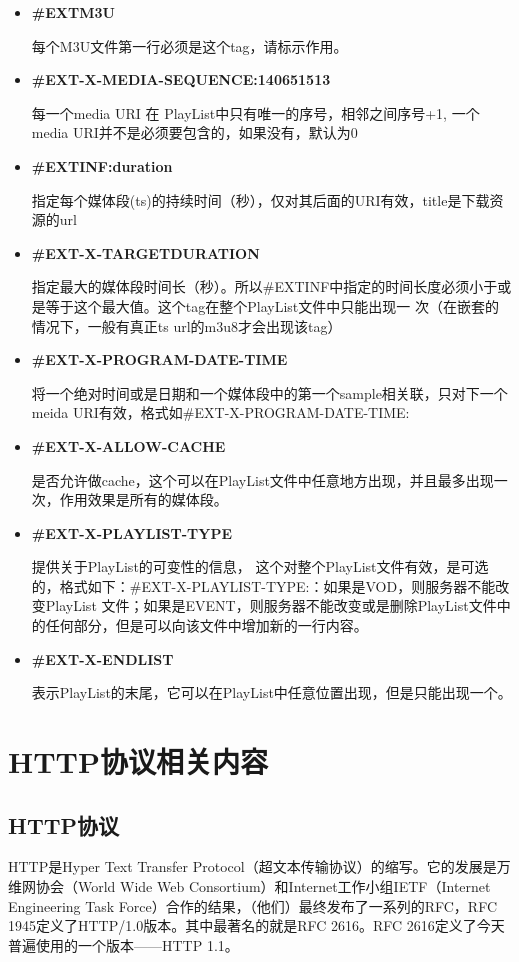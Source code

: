 \documentclass[bachelor]{thesis-uestc}
\begin{document}
\begin{itemize}
	\item \textbf{\#EXTM3U}

		每个M3U文件第一行必须是这个tag，请标示作用。
	\item \textbf{\#EXT-X-MEDIA-SEQUENCE:140651513} 

		每一个media URI 在 PlayList中只有唯一的序号，相邻之间序号+1, 一个media URI并不是必须要包含的，如果没有，默认为0
	\item \textbf{\#EXTINF:duration} 

		指定每个媒体段(ts)的持续时间（秒），仅对其后面的URI有效，title是下载资源的url
	\item \textbf{\#EXT-X-TARGETDURATION}

		指定最大的媒体段时间长（秒）。所以\#EXTINF中指定的时间长度必须小于或是等于这个最大值。这个tag在整个PlayList文件中只能出现一 次（在嵌套的情况下，一般有真正ts url的m3u8才会出现该tag）
	\item \textbf{\#EXT-X-PROGRAM-DATE-TIME}

		将一个绝对时间或是日期和一个媒体段中的第一个sample相关联，只对下一个meida URI有效，格式如\#EXT-X-PROGRAM-DATE-TIME:
	\item \textbf{\#EXT-X-ALLOW-CACHE}

		是否允许做cache，这个可以在PlayList文件中任意地方出现，并且最多出现一次，作用效果是所有的媒体段。
	\item \textbf{\#EXT-X-PLAYLIST-TYPE}

		提供关于PlayList的可变性的信息， 这个对整个PlayList文件有效，是可选的，格式如下：\#EXT-X-PLAYLIST-TYPE:：如果是VOD，则服务器不能改变PlayList 文件；如果是EVENT，则服务器不能改变或是删除PlayList文件中的任何部分，但是可以向该文件中增加新的一行内容。
	\item \textbf{\#EXT-X-ENDLIST}

		表示PlayList的末尾，它可以在PlayList中任意位置出现，但是只能出现一个。
\end{itemize}


\section{HTTP协议相关内容}

\subsection{HTTP协议}

HTTP是Hyper Text Transfer Protocol（超文本传输协议）的缩写。它的发展是万维网协会（World Wide Web Consortium）和Internet工作小组IETF（Internet Engineering Task Force）合作的结果，（他们）最终发布了一系列的RFC，RFC 1945定义了HTTP/1.0版本。其中最著名的就是RFC 2616。RFC 2616定义了今天普遍使用的一个版本——HTTP 1.1。
\end{document}
